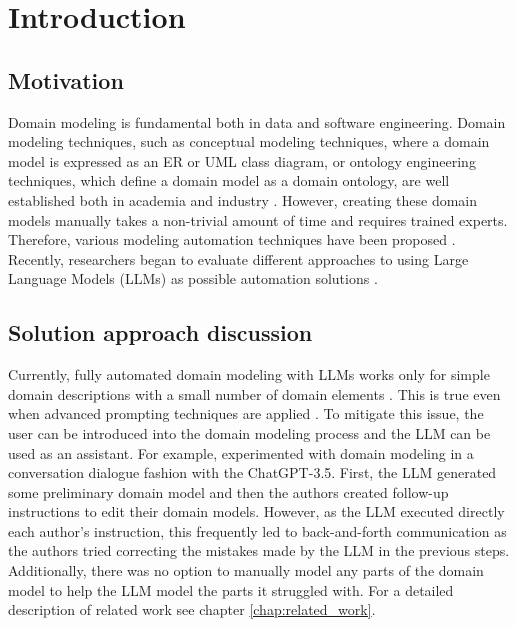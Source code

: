 \chapter*{Introduction}


\section*{Motivation}

Domain modeling is fundamental both in data and software engineering. Domain modeling techniques, such as conceptual modeling techniques, where a domain model is expressed as an ER or UML class diagram, or ontology engineering techniques, which define a domain model as a domain ontology, are well established both in academia and industry \cite{Verdonck2018}. However, creating these domain models manually takes a non-trivial amount of time and requires trained experts. Therefore, various modeling automation techniques have been proposed \cite{Sonbol2022}. Recently, researchers began to evaluate different approaches to using Large Language Models (LLMs) as possible automation solutions \cite{Chen2023,Saeedizade2024}.


\section*{Solution approach discussion}

Currently, fully automated domain modeling with LLMs works only for simple domain descriptions with a small number of domain elements \cite{Camara2023}. This is true even when advanced prompting techniques are applied \cite{Chen2023,Saeedizade2024}. To mitigate this issue, the user can be introduced into the domain modeling process \cite{Camara2023} and the LLM can be used as an assistant. For example, \citet{Camara2023} experimented with domain modeling in a conversation dialogue fashion with the ChatGPT-3.5. First, the LLM generated some preliminary domain model and then the authors created follow-up instructions to edit their domain models. However, as the LLM executed directly each author's instruction, this frequently led to back-and-forth communication as the authors tried correcting the mistakes made by the LLM in the previous steps. Additionally, there was no option to manually model any parts of the domain model to help the LLM model the parts it struggled with. For a detailed description of related work see chapter \ref{chap:related_work}.



